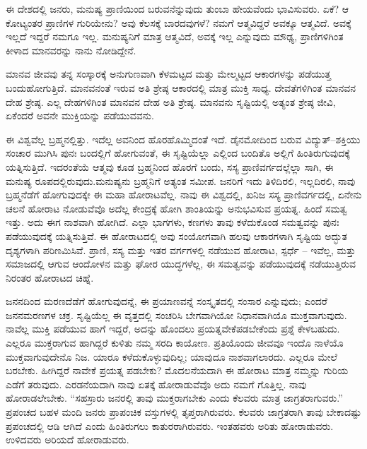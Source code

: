 ಈ ದೇಶದಲ್ಲಿ ಜನರು, ಮನುಷ್ಯ ಪ್ರಾಣಿಯಿಂದ ಬರುವನೆನ್ನುವುದು ತುಂಬಾ ಹೇಯವೆಂದು ಭಾವಿಸುವರು. ಏಕೆ? ಆ ಕೋಟ್ಯಂತರ ಪ್ರಾಣಿಗಳ ಗುರಿಯೇನು? ಅವು ಕೆಲಸಕ್ಕೆ ಬಾರದವುಗಳೆ? ನಮಗೆ ಆತ್ಮವಿದ್ದರೆ ಅವಕ್ಕೂ ಆತ್ಮವಿದೆ. ಅವಕ್ಕೆ ಇಲ್ಲದೆ ಇದ್ದರೆ ನಮಗೂ ಇಲ್ಲ. ಮನುಷ್ಯನಿಗೆ ಮಾತ್ರ ಆತ್ಮವಿದೆ, ಅವಕ್ಕೆ ಇಲ್ಲ ಎನ್ನುವುದು ಮೌಢ್ಯ, ಪ್ರಾಣಿಗಳಿಗಿಂತ ಕೀಳಾದ ಮಾನವರನ್ನು ನಾನು ನೋಡಿದ್ದೇನೆ.

\vskip 0.2cm

ಮಾನವ ಜೀವವು ತನ್ನ ಸಂಸ್ಕಾರಕ್ಕೆ ಅನುಗುಣವಾಗಿ ಕೆಳಮಟ್ಟದ ಮತ್ತು ಮೇಲ್ಮಟ್ಟದ ಆಕಾರಗಳನ್ನು ಪಡೆಯುತ್ತ ಬಂದುಹೋಗುತ್ತಿದೆ. ಮಾನವನಂತೆ ಇರುವ ಅತಿ ಶ್ರೇಷ್ಠ ಆಕಾರದಲ್ಲಿ ಮಾತ್ರ ಮುಕ್ತಿ ಸಾಧ್ಯ. ದೇವತೆಗಳಿಗಿಂತ ಮಾನವನ ದೇಹ ಶ್ರೇಷ್ಠ. ಎಲ್ಲ ದೇಹಗಳಿಗಿಂತ ಮಾನವನ ದೇಹ ಅತಿ ಶ್ರೇಷ್ಠ. ಮಾನವನು ಸೃಷ್ಟಿಯಲ್ಲಿ ಅತ್ಯಂತ ಶ್ರೇಷ್ಠ ಜೀವಿ, ಏಕೆಂದರೆ ಅವನೇ ಮುಕ್ತಿಯನ್ನು ಪಡೆಯುವವನು.

\vskip 0.2cm

ಈ ವಿಶ್ವವೆಲ್ಲ ಬ್ರಹ್ಮನಲ್ಲಿತ್ತು. ಇದೆಲ್ಲ ಅವನಿಂದ ಹೊರಹೊಮ್ಮಿದಂತೆ ಇದೆ. ಡೈನಮೋದಿಂದ ಬರುವ ವಿದ್ಯುತ್​–ಶಕ್ತಿಯು ಸಂಚಾರ ಮುಗಿಸಿ ಪುನಃ ಬಂದಲ್ಲಿಗೆ ಹೋಗುವಂತೆ, ಈ ಸೃಷ್ಟಿಯೆಲ್ಲಾ ಎಲ್ಲಿಂದ ಬಂದಿತೊ ಅಲ್ಲಿಗೆ ಹಿಂತಿರುಗುವುದಕ್ಕೆ ಯತ್ನಿಸುತ್ತಿದೆ. ಇದರಂತೆಯೆ ಆತ್ಮವು ಕೂಡ ಬ್ರಹ್ಮನಿಂದ ಹೊರಗೆ ಬಂದು, ಸಸ್ಯ ಪ್ರಾಣಿವರ್ಗದಲ್ಲೆಲ್ಲಾ ಸಾಗಿ, ಈ ಮನುಷ್ಯ ರೂಪದಲ್ಲಿರುವುದು.ಮನುಷ್ಯನು ಬ್ರಹ್ಮನಿಗೆ ಅತ್ಯಂತ ಸಮೀಪ. ಜನರಿಗೆ ಇದು ತಿಳಿದಿರಲಿ, ಇಲ್ಲದಿರಲಿ, ನಾವು ಬ್ರಹ್ಮನೆಡೆಗೆ ಹೋಗುವುದಕ್ಕೇ ಈ ಮಹಾ ಹೋರಾಟವೆಲ್ಲ. ನಾವು ಈ ವಿಶ್ವದಲ್ಲಿ, ಖನಿಜ ಸಸ್ಯ ಪ್ರಾಣಿವರ್ಗದಲ್ಲಿ, ಏನೇನು ಚಲನೆ ಹೋರಾಟ ನೋಡುವೆವೊ ಅದೆಲ್ಲ ಕೇಂದ್ರಕ್ಕೆ ಹೋಗಿ ಶಾಂತಿಯನ್ನು ಅನುಭವಿಸುವ ಪ್ರಯತ್ನ. ಹಿಂದೆ ಸಮತ್ವ ಇತ್ತು. ಅದು ಈಗ ನಾಶವಾಗಿ ಹೋಗಿದೆ. ಎಲ್ಲಾ ಭಾಗಗಳು, ಕಣಗಳು ತಾವು ಕಳೆದುಕೊಂಡ ಸಮತ್ವವನ್ನು ಪುನಃ ಪಡೆಯುವುದಕ್ಕೆ ಯತ್ನಿಸುತ್ತಿವೆ. ಈ ಹೋರಾಟದಲ್ಲಿ ಅವು ಸಂಯೋಗವಾಗಿ ಹಲವು ಆಕಾರಗಳಾಗಿ ಸೃಷ್ಟಿಯ ಅದ್ಭುತ ದೃಶ್ಯಗಳಾಗಿ ಪರಿಣಮಿಸಿವೆ. ಪ್ರಾಣಿ, ಸಸ್ಯ ಮತ್ತು ಇತರ ವರ್ಗಗಳಲ್ಲಿ ನಡೆಯುವ ಹೋರಾಟ, ಸ್ಪರ್ಧೆ – ಇವೆಲ್ಲ, ಮತ್ತು ಸಮಾಜದಲ್ಲಿ ಆಗುವ ಆಂದೋಳನ ಮತ್ತು ಘೋರ ಯುದ್ಧಗಳೆಲ್ಲ, ಈ ಸಮತ್ವವನ್ನು ಪಡೆಯುವುದಕ್ಕೆ ನಡೆಯು\break ತ್ತಿರುವ ನಿರಂತರ ಹೋರಾಟದ ಚಿಹ್ನೆ.

\vskip 0.2cm

ಜನನದಿಂದ ಮರಣದೆಡೆಗೆ ಹೋಗುವುದನ್ನೆ, ಈ ಪ್ರಯಾಣವನ್ನೆ ಸಂಸ್ಕೃತದಲ್ಲಿ ಸಂಸಾರ ಎನ್ನುವುದು; ಎಂದರೆ ಜನನಮರಣಗಳ ಚಕ್ರ. ಸೃಷ್ಟಿಯೆಲ್ಲ ಈ ವೃತ್ತದಲ್ಲಿ ಸಂಚರಿಸಿ ಬೇಗವಾಗಿಯೋ ನಿಧಾನವಾಗಿಯೊ ಮುಕ್ತವಾಗುವುದು. ನಾವೆಲ್ಲ ಮುಕ್ತಿ ಪಡೆಯುವ ಹಾಗೆ ಇದ್ದರೆ, ಅದನ್ನು ಹೊಂದಲು ಪ್ರಯತ್ನವೇಕೆಪಡಬೇಕೆಂದು ಪ್ರಶ್ನೆ ಕೇಳಬಹುದು. ಎಲ್ಲರೂ ಮುಕ್ತರಾಗುವ ಹಾಗಿದ್ದರೆ ಕುಳಿತು ನಮ್ಮ ಸರದಿ ಕಾಯೋಣ. ಪ್ರತಿಯೊಂದು ಜೀವವೂ ಇಂದೊ ನಾಳೆಯೊ ಮುಕ್ತವಾಗುವುದೇನೊ ನಿಜ. ಯಾರೂ ಕಳೆದುಕೊಳ್ಳುವುದಿಲ್ಲ; ಯಾವುದೂ ನಾಶವಾಗಲಾರದು. ಎಲ್ಲರೂ ಮೇಲೆ ಬರಬೇಕು. ಹೀಗಿದ್ದರೆ ನಾವೇಕೆ ಪ್ರಯತ್ನ ಪಡಬೇಕು? ಮೊದಲನೆಯದಾಗಿ ಈ ಹೋರಾಟ ಮಾತ್ರ ನಮ್ಮನ್ನು ಗುರಿಯ ಎಡೆಗೆ ತರುವುದು. ಎರಡನೆಯದಾಗಿ ನಾವು ಏತಕ್ಕೆ ಹೋರಾಡುವೆವೊ ಅದು ನಮಗೆ ಗೊತ್ತಿಲ್ಲ. ನಾವು ಹೋರಾಡಲೇಬೇಕು. “ಸಹಸ್ರಾರು ಜನರಲ್ಲಿ ತಾವು ಮುಕ್ತರಾಗಬೇಕು ಎಂದು ಕೆಲವರು ಮಾತ್ರ ಜಾಗ್ರತರಾಗುವರು.” ಪ್ರಪಂಚದ ಬಹಳ ಮಂದಿ ಜನರು ಪ್ರಾಪಂಚಿಕ ವಸ್ತುಗಳಲ್ಲಿ ತೃಪ್ತರಾಗಿರುವರು. ಕೆಲವರು ಜಾಗ್ರತರಾಗಿ ತಾವು ಬೇಕಾದಷ್ಟು ಪ್ರಪಂಚದಲ್ಲಿ ಆಡಿ ಆಗಿದೆ ಎಂದು ಹಿಂತಿರುಗಲು ಕಾತುರರಾಗಿರುವರು. ಇಂತಹವರು ಅರಿತು ಹೋರಾಡುವರು. ಉಳಿದವರು ಅರಿಯದೆ ಹೋರಾಡುವರು.

